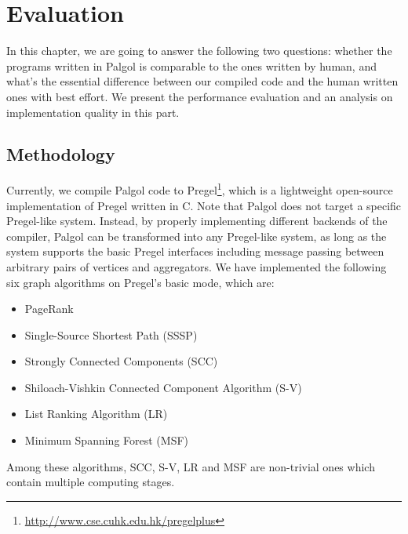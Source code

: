 \documentclass{sokendai_thesis} %
\newcommand{\plus}{\raisebox{.25ex}{\scalebox{.8}{+}}}
\newcommand{\plusplus}{\plus\plus}
\begin{document}
\chapter{Evaluation}
\label{sec:evaluation}

In this chapter, we are going to answer the following two questions: whether the programs written in Palgol is comparable to the ones written by human, and what's the essential difference between our compiled code and the human written ones with best effort.
We present the performance evaluation and an analysis on implementation quality in this part.

\section{Methodology}


Currently, we compile Palgol code to Pregel\plus\footnote{\url{http://www.cse.cuhk.edu.hk/pregelplus}}, which is a lightweight open-source implementation of Pregel written in C\plusplus.
Note that Palgol does not target a specific Pregel-like system.
Instead, by properly implementing different backends of the compiler, Palgol can be transformed into any Pregel-like system, as long as the system supports the basic Pregel interfaces including message passing between arbitrary pairs of vertices and aggregators.
We have implemented the following six graph algorithms on Pregel\plus's basic mode, which are:
\begin{itemize}\setlength\itemsep{-0.4em}
 \item PageRank~\cite{pregel}
 \item Single-Source Shortest Path (SSSP)~\cite{pregel}
 \item Strongly Connected Components (SCC)~\cite{connectivity}
 \item Shiloach-Vishkin Connected Component Algorithm (S-V)~\cite{connectivity}
 \item List Ranking Algorithm (LR)~\cite{connectivity}
 \item Minimum Spanning Forest (MSF)~\cite{boruvka}
\end{itemize}
Among these algorithms, SCC, S-V, LR and MSF are non-trivial ones which contain multiple computing stages.
\end{document}
